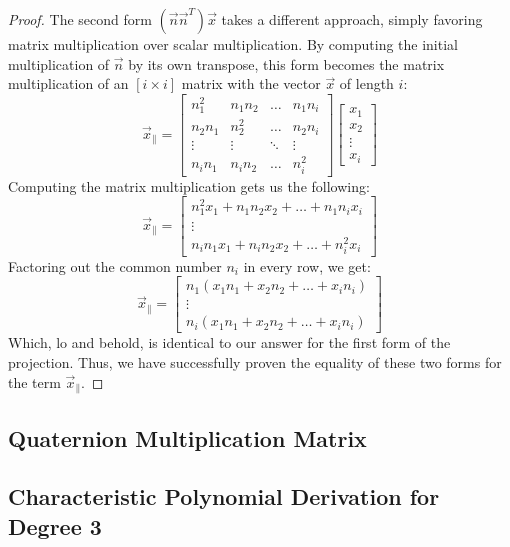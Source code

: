 \documentclass[12pt]{report}
\begin{document}
\begin{proof}
The second form $(\vec{n}\vec{n}^T)\vec{x}$ takes a different approach, simply favoring matrix multiplication over scalar multiplication. By computing the initial multiplication of $\vec{n}$ by its own transpose, this form becomes the matrix multiplication of an $[i\times i]$ matrix with the vector $\vec{x}$ of length $i$:
$$\vec{x}_\parallel=\begin{bmatrix}
    n_1^2&n_1n_2&\ldots&n_1n_i\\
    n_2n_1&n_2^2&\ldots&n_2n_i\\
    \vdots&\vdots&\ddots&\vdots\\
    n_in_1&n_in_2&\ldots&n_i^2
\end{bmatrix}\begin{bmatrix}
    x_1\\x_2\\\vdots\\x_i
\end{bmatrix}$$
Computing the matrix multiplication gets us the following:
$$\vec{x}_\parallel=\begin{bmatrix}
    n_1^2x_1+n_1n_2x_2+\ldots+n_1n_ix_i\\
    \vdots\\
    n_in_1x_1+n_in_2x_2+\ldots+n_i^2x_i
\end{bmatrix}$$
Factoring out the common number $n_i$ in every row, we get:
$$\vec{x}_\parallel=\begin{bmatrix}
    n_1(x_1n_1+x_2n_2+\ldots+x_in_i)\\
    \vdots\\
    n_i(x_1n_1+x_2n_2+\ldots+x_in_i)
\end{bmatrix}$$
Which, lo and behold, is identical to our answer for the first form of the projection. Thus, we have successfully proven the equality of these two forms for the term $\vec{x}_\parallel$.
\end{proof}




\subsection{Quaternion Multiplication Matrix}\label{sec:QuatMultiplyMatrix}







\subsection{Characteristic Polynomial Derivation for Degree 3}
\end{document}
